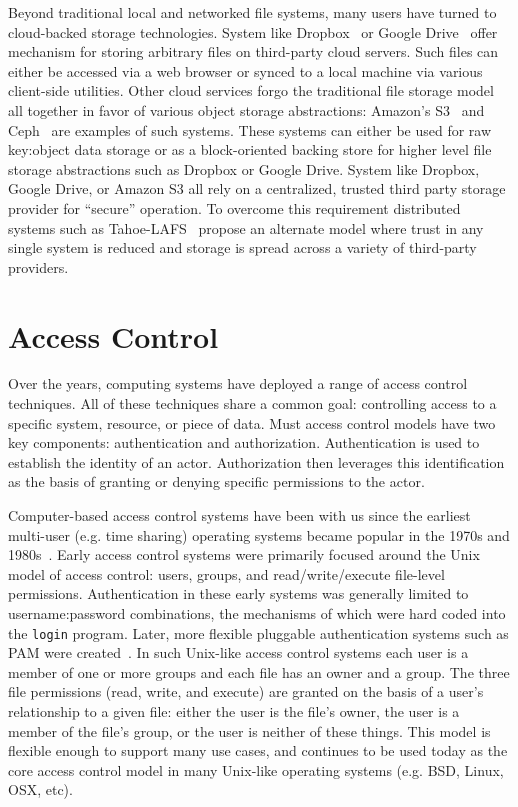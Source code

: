 Beyond traditional local and networked file systems, many users have
turned to cloud-backed storage technologies. System like
Dropbox~\cite{dropbox} or Google Drive~\cite{google-drive} offer
mechanism for storing arbitrary files on third-party cloud
servers. Such files can either be accessed via a web browser or synced
to a local machine via various client-side utilities. Other cloud
services forgo the traditional file storage model all together in
favor of various object storage abstractions: Amazon's
S3~\cite{amazon-s3} and Ceph~\cite{ceph} are examples of such
systems. These systems can either be used for raw key:object data
storage or as a block-oriented backing store for higher level file
storage abstractions such as Dropbox or Google Drive. System like
Dropbox, Google Drive, or Amazon S3 all rely on a centralized, trusted
third party storage provider for ``secure'' operation. To overcome
this requirement distributed systems such as
Tahoe-LAFS~\cite{wilcox-o'hearn2008} propose an alternate model where
trust in any single system is reduced and storage is spread across a
variety of third-party providers.

\section{Access Control}
\label{chap:background:ac}

Over the years, computing systems have deployed a range of access
control techniques. All of these techniques share a common goal:
controlling access to a specific system, resource, or piece of
data. Must access control models have two key components:
authentication and authorization.  Authentication is used to establish
the identity of an actor. Authorization then leverages this
identification as the basis of granting or denying specific
permissions to the actor.

Computer-based access control systems have been with us since the
earliest multi-user (e.g. time sharing) operating systems became
popular in the 1970s and 1980s~\cite{saltzer1974}. Early access
control systems were primarily focused around the Unix model of access
control: users, groups, and read/write/execute file-level
permissions. Authentication in these early systems was generally
limited to username:password combinations, the mechanisms of which
were hard coded into the \texttt{login} program. Later, more flexible
pluggable authentication systems such as PAM were
created~\cite{samar1996, linux-pam, openpam}. In such Unix-like access
control systems each user is a member of one or more groups and each
file has an owner and a group. The three file permissions (read,
write, and execute) are granted on the basis of a user's relationship
to a given file: either the user is the file's owner, the user is a
member of the file's group, or the user is neither of these
things. This model is flexible enough to support many use cases, and
continues to be used today as the core access control model in many
Unix-like operating systems (e.g. BSD, Linux, OSX, etc).

